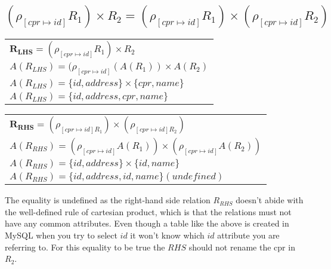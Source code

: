 \subsection{\normalsize{$(\rho_{[cpr \mapsto id]}R_1) \times R_2 = (\rho_{[cpr \mapsto id]}R_1) \times (\rho_{[cpr \mapsto id]}R_2)$}}

\begin{table}[ht]
	\begin{tabular}{|l|}
		$\bm{R_{LHS}} = (\rho_{[cpr \mapsto id]}R_1) \times R_2$ \\[0.2cm]
		$A(R_{LHS}) = (\rho_{[cpr\mapsto id]}(A(R_1)) \times A(R_2)$  \\[0.2cm]
		$A(R_{LHS}) = \{id, address\} \times \{cpr, name\}$  \\[0.2cm]
		$A(R_{LHS}) = \{id, address, cpr, name\}$
	\end{tabular}
\end{table}

\begin{table}[ht]
	\begin{tabular}{|l|}
		$\bm{R_{RHS}} = (\rho_{[cpr \mapsto id]R_1}) \times (\rho_{[cpr \mapsto id]R_2})$ \\[0.2cm]
		$A(R_{RHS}) = (\rho_{[cpr\mapsto id]}A(R_1)) \times (\rho_{[cpr \mapsto id]}A(R_2))$ \\[0.2cm]
		$A(R_{RHS}) = \{id, address\} \times \{id, name\}$ \\[0.2cm]
		$A(R_{RHS}) = \{id, address, id, name\}(undefined)$ 
	\end{tabular}
\end{table}
\FloatBarrier

The equality is undefined as the right-hand side relation $R_{RHS}$ doesn't abide with the well-defined rule of cartesian product, which is that the relations must not have any common attributes. Even though a table like the above is created in MySQL when you try to select $id$ it won't know which $id$ attribute you are referring to.
For this equality to be true the $RHS$ should not rename the cpr in $R_2$.\\\\
